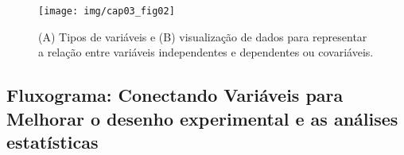 \documentclass[
]{article}
\begin{document}
\begin{figure}

{\centering \texttt{[image: img/cap03\_fig02]} 

}

\caption{(A) Tipos de variáveis e (B) visualização de dados para representar a relação entre variáveis independentes e dependentes ou covariáveis.}\label{fig:fig-box}
\end{figure}

\hypertarget{fluxograma-conectando-variuxe1veis-para-melhorar-o-desenho-experimental-e-as-anuxe1lises-estatuxedsticas}{%
\subsection{Fluxograma: Conectando Variáveis para Melhorar o desenho experimental e as análises estatísticas}\label{fluxograma-conectando-variuxe1veis-para-melhorar-o-desenho-experimental-e-as-anuxe1lises-estatuxedsticas}}
\end{document}
